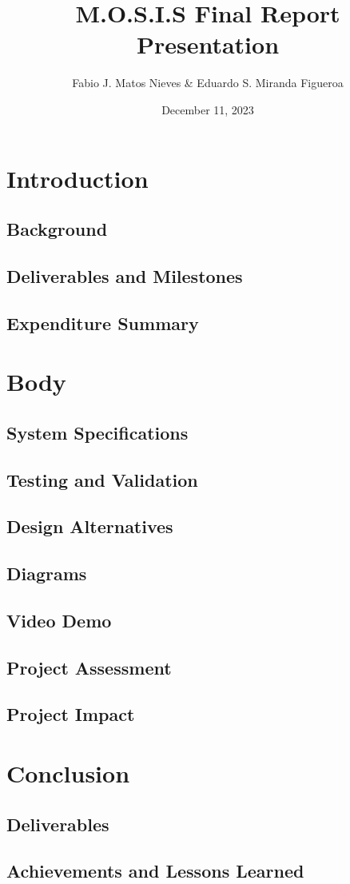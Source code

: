 \documentclass[17pt, aspectratio=169]{beamer}
\title{M.O.S.I.S Final Report Presentation}
\author[Fabio J. \& Eduardo S.]{Fabio J. Matos Nieves \& Eduardo S. Miranda Figueroa}
\institute[UPRM]{University of Puerto Rico Mayagüez Campus}
\date{December 11, 2023}
\begin{document}
  \begin{frame}
    \maketitle
  \end{frame}
  \begin{frame}
   \tableofcontents 
  \end{frame}
  \section{Introduction}
  \subsection*{Background}
  \subsection*{Deliverables and Milestones}
  \subsection*{Expenditure Summary}
  \section{Body}
  \subsection*{System Specifications}
  \subsection*{Testing and Validation}
  \subsection*{Design Alternatives}
  \subsection*{Diagrams}
  \subsection{Video Demo}
  \subsection{Project Assessment}
  \subsection*{Project Impact}
  \section{Conclusion}
  \subsection{Deliverables}
  \subsection{Achievements and Lessons Learned}
\end{document}
